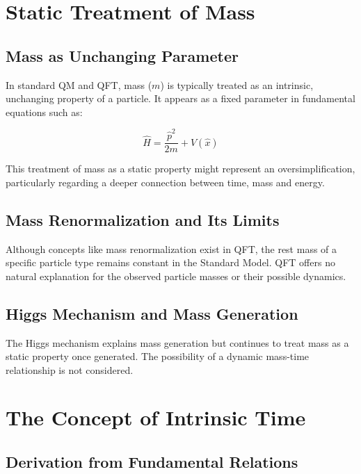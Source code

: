 \documentclass[12pt,a4paper]{article}  %
\begin{document}
	\section{Static Treatment of Mass}
	
	\subsection{Mass as Unchanging Parameter}
	
	In standard QM and QFT, mass ($m$) is typically treated as an intrinsic, unchanging property of a particle. It appears as a fixed parameter in fundamental equations such as:
	
	\begin{equation}
		\hat{H} = \frac{\hat{p}^2}{2m} + V(\hat{x})
	\end{equation}
	
	This treatment of mass as a static property might represent an oversimplification, particularly regarding a deeper connection between time, mass and energy.
	
	\subsection{Mass Renormalization and Its Limits}
	
	Although concepts like mass renormalization exist in QFT, the rest mass of a specific particle type remains constant in the Standard Model. QFT offers no natural explanation for the observed particle masses or their possible dynamics.
	
	\subsection{Higgs Mechanism and Mass Generation}
	
	The Higgs mechanism explains mass generation but continues to treat mass as a static property once generated. The possibility of a dynamic mass-time relationship is not considered.
	
	\section{The Concept of Intrinsic Time}
	
	\subsection{Derivation from Fundamental Relations}
	
\end{document}
